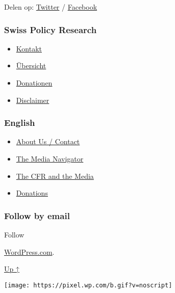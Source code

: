 Delen op:
\href{https://twitter.com/intent/tweet?url=https://swprs.org/feiten-over-covid19/}{Twitter}
/
\href{https://www.facebook.com/share.php?u=https://swprs.org/feiten-over-covid19/}{Facebook}

\hypertarget{swiss-policy-research}{%
\subsubsection{Swiss Policy Research}\label{swiss-policy-research}}

\begin{itemize}
\tightlist
\item
  \href{https://swprs.org/kontakt/}{Kontakt}
\item
  \href{https://swprs.org/uebersicht/}{Übersicht}
\item
  \href{https://swprs.org/donationen/}{Donationen}
\item
  \href{https://swprs.org/disclaimer/}{Disclaimer}
\end{itemize}

\hypertarget{english}{%
\subsubsection{English}\label{english}}

\begin{itemize}
\tightlist
\item
  \href{https://swprs.org/contact/}{About Us / Contact}
\item
  \href{https://swprs.org/media-navigator/}{The Media Navigator}
\item
  \href{https://swprs.org/the-american-empire-and-its-media/}{The CFR
  and the Media}
\item
  \href{https://swprs.org/donations/}{Donations}
\end{itemize}

\hypertarget{follow-by-email}{%
\subsubsection{Follow by email}\label{follow-by-email}}

Follow

\href{https://wordpress.com/?ref=footer_custom_com}{WordPress.com}.

\protect\hyperlink{}{Up ↑}

\texttt{[image: https://pixel.wp.com/b.gif?v=noscript]}
